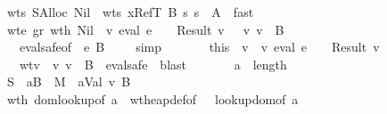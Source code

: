 \begin{isabellebody}
\ \ \ \ \ \ \isamarkupfalse \ wts\ SAlloc\ Nil\ \isamarkupfalse \ wts{}{\isacharcolon}\ {\isachardoublequoteopen}{\isacharparenleft}x{\isacharcomma}RefT\ B{\isacharparenright}{\isacharhash}{\isasymGamma}\ {\isasymturnstile}\isactrlisub s\ s{\isacharprime}\ {\isacharcolon}\ A{\isacharprime}{\isachardoublequoteclose}\ \isamarkupfalse \ fast\ \isanewline
\ \ \ \ \ \ \isamarkupfalse \ wte\ gr\ wt{\isacharunderscore}h\ Nil\ \isamarkupfalse \ {\isachardoublequoteopen}{\isacharparenleft}{\isasymexists}v{\isachardot}\ eval\ e\ {\isasymrho}\ {\isasymmu}\ {\isacharequal}\ Result\ v\ {\isasymand}\ {\isasymSigma}\ {\isasymturnstile}v\ v\ {\isacharcolon}\ B{\isacharparenright}{\isachardoublequoteclose}\isanewline
\ \ \ \ \ \ \ \ \isamarkupfalse \ eval{\isacharunderscore}safe{\isacharbrackleft}of\ {\isasymGamma}\ e\ B\ {\isasymSigma}\ {\isasymrho}\ {\isasymmu}{\isacharbrackright}\ \isamarkupfalse \ simp\isanewline
\ \ \ \ \ \ \isamarkupfalse \ this\ \isamarkupfalse \ v\ \ v{\isacharcolon}\ {\isachardoublequoteopen}eval\ e\ {\isasymrho}\ {\isasymmu}\ {\isacharequal}\ Result\ v{\isachardoublequoteclose}\isanewline
\ \ \ \ \ \ \ \ \ wtv{\isacharcolon}\ {\isachardoublequoteopen}{\isasymSigma}\ {\isasymturnstile}v\ v\ {\isacharcolon}\ B{\isachardoublequoteclose}\ \isamarkupfalse \ eval{\isacharunderscore}safe\ \isamarkupfalse \ blast\isanewline
\ \ \ \ \ \ \isamarkupfalse \ {\isacharquery}a\ {\isacharequal}\ {\isachardoublequoteopen}length\ {\isasymmu}{\isachardoublequoteclose}\isanewline
\ \ \ \ \ \ \isamarkupfalse \ {\isacharquery}S{}\ {\isacharequal}\ {\isachardoublequoteopen}{\isacharparenleft}{\isacharquery}a{\isacharcomma}B{\isacharparenright}{\isacharhash}{\isasymSigma}{\isachardoublequoteclose}\ \ {\isacharquery}M{}\ {\isacharequal}\ {\isachardoublequoteopen}{\isacharparenleft}{\isacharquery}a{\isacharcomma}{\isacharparenleft}Val\ v{\isacharcomma}\ B{\isacharparenright}{\isacharparenright}{\isacharhash}{\isasymmu}{\isachardoublequoteclose}\isanewline
\ \ \ \ \ \ \isamarkupfalse \ wt{\isacharunderscore}h\ dom{\isacharunderscore}lookup{\isacharbrackleft}of\ {\isacharquery}a\ {\isasymSigma}{\isacharbrackright}\ wt{\isacharunderscore}heap{\isacharunderscore}def{\isacharbrackleft}of\ {\isasymSigma}\ {\isasymmu}{\isacharbrackright}\ lookup{\isacharunderscore}dom{\isacharbrackleft}of\ {\isacharquery}a\ {\isasymmu}{\isacharbrackright}\isanewline

\end{isabellebody}
